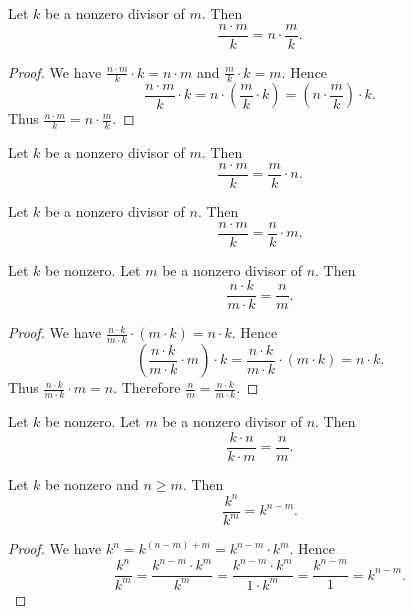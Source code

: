 \documentclass[../../arithmetic.ftl.tex]{subfiles}
\begin{document}
\begin{forthel}
    \begin{proposition}\label{Arithmetic_03_05_170600}
      Let $k$ be a nonzero divisor of $m$.
      Then \[ \frac{n \cdot m}{k} = n \cdot \frac{m}{k}. \]
    \end{proposition}
    \begin{proof}
      We have $\frac{n \cdot m}{k} \cdot k = n \cdot m$ and $\frac{m}{k} \cdot k = m$.
      Hence
      \[  \frac{n \cdot m}{k} \cdot k
          = n \cdot (\frac{m}{k} \cdot k)
          = (n \cdot \frac{m}{k}) \cdot k. \]
      Thus $\frac{n \cdot m}{k} = n \cdot \frac{m}{k}$.
    \end{proof}

    \begin{corollary}\label{Arithmetic_03_05_173047}
      Let $k$ be a nonzero divisor of $m$.
      Then \[ \frac{n \cdot m}{k} = \frac{m}{k} \cdot n. \]
    \end{corollary}

    \begin{corollary}\label{Arithmetic_03_05_401748}
      Let $k$ be a nonzero divisor of $n$.
      Then \[ \frac{n \cdot m}{k} = \frac{n}{k} \cdot m. \]
    \end{corollary}

    \begin{proposition}\label{Arithmetic_03_05_243924}
      Let $k$ be nonzero.
      Let $m$ be a nonzero divisor of $n$.
      Then \[ \frac{n \cdot k}{m \cdot k} = \frac{n}{m}. \]
    \end{proposition}
    \begin{proof}
      We have $\frac{n \cdot k}{m \cdot k} \cdot (m \cdot k) = n \cdot k$.
      Hence
      \[  (\frac{n \cdot k}{m \cdot k} \cdot m) \cdot k
          = \frac{n \cdot k}{m \cdot k} \cdot (m \cdot k)
          = n \cdot k. \]
      Thus $\frac{n \cdot k}{m \cdot k} \cdot m = n$.
      Therefore $\frac{n}{m} = \frac{n \cdot k}{m \cdot k}$.
    \end{proof}

    \begin{corollary}\label{Arithmetic_03_05_424330}
      Let $k$ be nonzero.
      Let $m$ be a nonzero divisor of $n$.
      Then \[ \frac{k \cdot n}{k \cdot m} = \frac{n}{m}. \]
    \end{corollary}

    \begin{proposition}\label{Arithmetic_03_05_469833}
      Let $k$ be nonzero and $n \geq m$.
      Then \[ \frac{k^{n}}{k^{m}} = k^{n - m}. \]
    \end{proposition}
    \begin{proof}
      We have $k^{n} = k^{(n - m) + m} = k^{n - m} \cdot k^{m}$.
      Hence
      \[  \frac{k^{n}}{k^{m}}
          = \frac{k^{n - m} \cdot k^{m}}{k^{m}}
          = \frac{k^{n - m} \cdot k^{m}}{1 \cdot k^{m}}
          = \frac{k^{n - m}}{1}
          = k^{n - m}. \]
    \end{proof}


\end{forthel}
\end{document}
